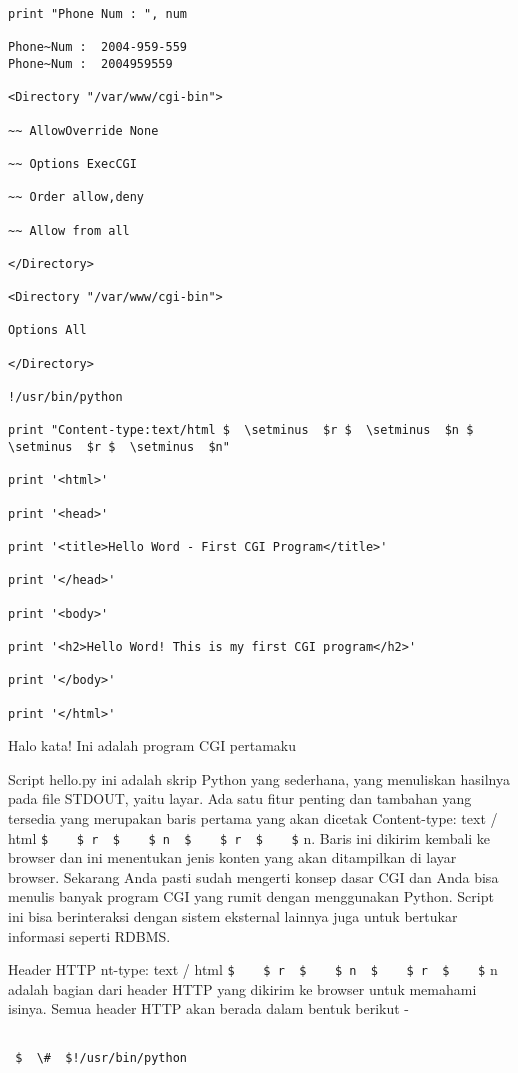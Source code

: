 \begin {enumerate}
\begin {enumerate}
\begin{verbatim}
print "Phone Num : ", num

Phone~Num :  2004-959-559
Phone~Num :  2004959559

<Directory "/var/www/cgi-bin">

~~ AllowOverride None

~~ Options ExecCGI

~~ Order allow,deny

~~ Allow from all

</Directory>

<Directory "/var/www/cgi-bin">

Options All

</Directory>

!/usr/bin/python

print "Content-type:text/html $  \setminus  $r $  \setminus  $n $  \setminus  $r $  \setminus  $n"

print '<html>'

print '<head>'

print '<title>Hello Word - First CGI Program</title>'

print '</head>'

print '<body>'

print '<h2>Hello Word! This is my first CGI program</h2>'

print '</body>'

print '</html>'
\end{verbatim}

Halo kata! Ini adalah program CGI pertamaku

Script hello.py ini adalah skrip Python yang sederhana, yang menuliskan hasilnya pada file STDOUT, yaitu layar. Ada satu fitur penting dan tambahan yang tersedia yang merupakan baris pertama yang akan dicetak Content-type: text / html  \verb|$    $ r  $    $ n  $    $ r  $    $| n. Baris ini dikirim kembali ke browser dan ini menentukan jenis konten yang akan ditampilkan di layar browser. Sekarang Anda pasti sudah mengerti konsep dasar CGI dan Anda bisa menulis banyak program CGI yang rumit dengan menggunakan Python. Script ini bisa berinteraksi dengan sistem eksternal lainnya juga untuk bertukar informasi seperti RDBMS.

Header HTTP
nt-type: text / html  \verb|$    $ r  $    $ n  $    $ r  $    $| n adalah bagian dari header HTTP yang dikirim ke browser untuk memahami isinya. Semua header HTTP akan berada dalam bentuk berikut -

\begin{verbatim}

 $  \#  $!/usr/bin/python


\end{verbatim}
\end{enumerate}
\end{enumerate}
